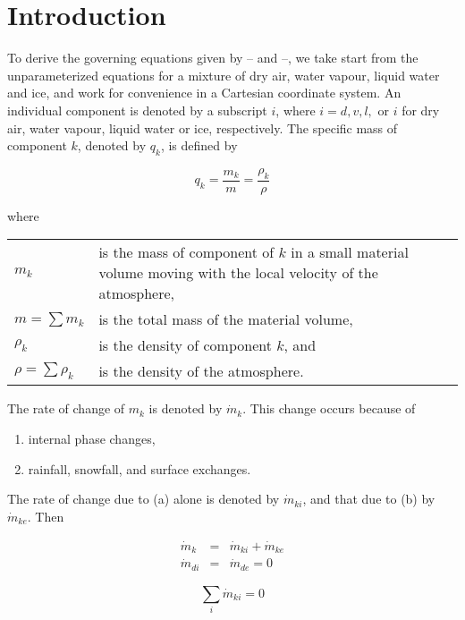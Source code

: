 \section{Introduction}\label{sA.1}

To derive the governing equations given by
-- and --,
we take start from the unparameterized equations for a mixture of dry
air, water vapour, liquid water and ice, and work for convenience in a
Cartesian coordinate system. An individual component is denoted by a
subscript $i$, where $i = d, v, l,$ or $i$ for dry air, water vapour,
liquid water or ice, respectively. The specific mass of component $k$,
denoted by $q_k$, is defined by

\begin{equation}
\label{A.1.1}
q_k = \frac{m_k}{m} = \frac{\rho_k}{\rho}
\end{equation}

where

\begin{tabular}{lp{10cm}}
$m_k$ & is the mass of component of $k$ in a small
material volume moving with
the local velocity of the atmosphere, \\
$m =\sum m_k$ &is the total mass of the material volume, \\
$\rho_k$& is the density of component  $k$, and \\
$\rho = \sum \rho_k$ &is the density of the atmosphere.
\end{tabular}

The rate of change of $m_k$ is denoted by $\dot{m}_k$. This change
occurs because of

\renewcommand{\labelenumi}{\alph{enumi}.}
\begin{enumerate}
\item\label{a} internal phase changes,
\item\label{b} rainfall, snowfall, and surface exchanges.
\end{enumerate}

The rate of change due to (a) alone is denoted by
$\dot{m}_{ki}$, and that due to (b) by $\dot{m}_{ke}$. Then

\begin{eqnarray}
\label{A.1.2}\dot{m}_k & = & \dot{m}_{ki} + \dot{m}_{ke} \\
\label{A.1.3}\dot{m}_{di} & = & \dot{m}_{de} = 0
\end{eqnarray}

\begin{equation}
\label{A.1.4}\sum_i  \dot{m}_{ki} = 0
\end{equation}

